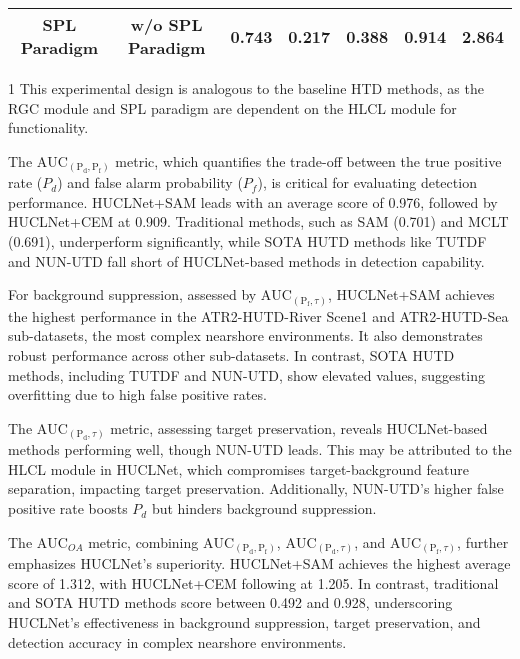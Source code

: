\begin{table*}[!ht]
\begin{threeparttable}
{\begin{tabular}{ccccccc}
        \rowcolor{tablecolor3!50} 
        \textbf{SPL Paradigm}                                          & w/o SPL Paradigm                                            & 0.743 & 0.217 & 0.388 & 0.914 & 2.864 \\ \hline
        \end{tabular}}
        \begin{tablenotes}
            \scriptsize
            \item[1] This experimental design is analogous to the baseline HTD methods, as the RGC module and SPL paradigm are dependent on the HLCL module for functionality.
        \end{tablenotes}
        \end{threeparttable}
\end{table*}
The $\text{AUC}_{( \mathrm{P}_{\mathrm{d}}, \mathrm{P}_{\mathrm{f}})}$ metric, which quantifies the trade-off between the true positive rate ($P_d$) and false alarm probability ($P_f$), is critical for evaluating detection performance. HUCLNet+SAM leads with an average score of 0.976, followed by HUCLNet+CEM at 0.909. Traditional methods, such as SAM (0.701) and MCLT (0.691), underperform significantly, while SOTA HUTD methods like TUTDF and NUN-UTD fall short of HUCLNet-based methods in detection capability.
\par
For background suppression, assessed by $\text{AUC}_{( \mathrm{P}_{\mathrm{f}}, \tau)}$, HUCLNet+SAM achieves the highest performance in the ATR2-HUTD-River Scene1 and ATR2-HUTD-Sea sub-datasets, the most complex nearshore environments. It also demonstrates robust performance across other sub-datasets. In contrast, SOTA HUTD methods, including TUTDF and NUN-UTD, show elevated values, suggesting overfitting due to high false positive rates.
\par
The $\text{AUC}_{( \mathrm{P}_{\mathrm{d}}, \tau)}$ metric, assessing target preservation, reveals HUCLNet-based methods performing well, though NUN-UTD leads. This may be attributed to the HLCL module in HUCLNet, which compromises target-background feature separation, impacting target preservation. Additionally, NUN-UTD's higher false positive rate boosts $P_d$ but hinders background suppression.
\par
The $\text{AUC}_{OA}$ metric, combining $\text{AUC}_{( \mathrm{P}_{\mathrm{d}}, \mathrm{P}_{\mathrm{f}})}$, $\text{AUC}_{( \mathrm{P}_{\mathrm{d}}, \tau)}$, and $\text{AUC}_{( \mathrm{P}_{\mathrm{f}}, \tau)}$, further emphasizes HUCLNet's superiority. HUCLNet+SAM achieves the highest average score of 1.312, with HUCLNet+CEM following at 1.205. In contrast, traditional and SOTA HUTD methods score between 0.492 and 0.928, underscoring HUCLNet's effectiveness in background suppression, target preservation, and detection accuracy in complex nearshore environments.
